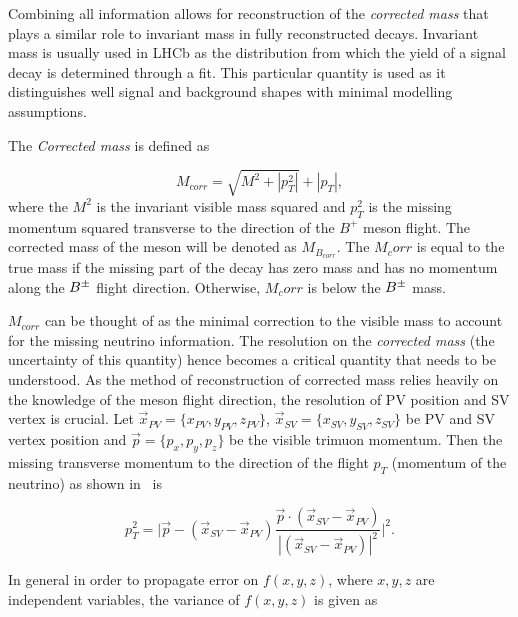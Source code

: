 Combining all information allows for reconstruction of the \emph{corrected mass} that plays a similar role to invariant mass in fully reconstructed decays. Invariant mass is usually used in \gls{LHCb} as the distribution from which the yield of a signal decay is determined through a fit. This particular quantity is used as it distinguishes well signal and background shapes with minimal modelling assumptions.

The \emph{Corrected mass} is defined as

\begin{equation}
	M_{corr} = \sqrt{{M}^{2} + |p^{2}_{T}|} + |p_{T}|,
\label{eq:corrm}        
\end{equation}	
where the $M^{2}$ is the invariant visible mass squared and $p^{2}_{T}$ is the missing momentum squared transverse to the direction of the $B^{+}$ meson flight. The corrected mass of the \Bpm meson will be denoted as $M_{B_{corr}}$. The $M_corr$ is equal to the true mass if the missing part of the decay has zero mass and has no momentum along the ${{B}^\pm}$ flight direction. Otherwise, $M_corr$ is below the ${{B}^\pm}$ mass.

$M_{corr}$ can be thought of as the minimal correction to the visible mass to account for the missing neutrino information. The resolution on the \textit{corrected mass} (the uncertainty of this quantity) hence becomes a critical quantity that needs to be understood. As the method of reconstruction of corrected mass relies heavily on the knowledge of the \Bpm meson flight direction, the resolution of \gls{PV} position and \gls{SV} vertex is crucial. Let $\vec{{x}}_{PV}=\{x_{PV},y_{PV},z_{PV}\}$, $\vec{{x}}_{SV}=\{x_{SV},y_{SV},z_{SV}\} $ be \gls{PV} and \gls{SV} vertex position and $\vec{p}=\{p_{x},p_{y},p_{z}\}$ be the visible trimuon momentum. Then the missing transverse momentum to the direction of the flight $p_{T}$ (momentum of the neutrino) as shown in~\cite{Egede:1694339} is


\begin{equation}
	p^{2}_{T} = \Big|\vec{p} - (\vec{{x}}_{SV}-\vec{{x}}_{PV})\frac{\vec{p} \cdot(\vec{{x}}_{SV}-\vec{{x}}_{PV})}{|(\vec{{x}}_{SV}-\vec{{x}}_{PV})|^{2}}\Big|^{2}. 
\label{eq:ptmis}
\end{equation}



In general in order to propagate error on $f(x,y,z)$, where $x,y,z$ are independent variables, the variance of $f(x,y,z)$ is given as

